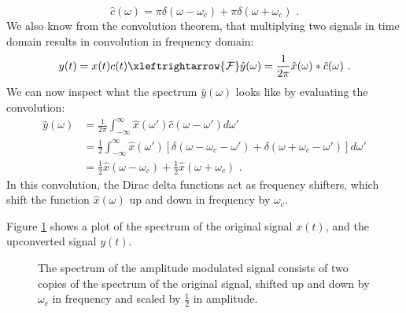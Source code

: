 \begin{equation}
\hat{c}(\omega) = \pi\delta(\omega - \omega_c) + \pi\delta(\omega + \omega_c)\,\,.
\end{equation}
We also know from the convolution theorem, that multiplying two
signals in time domain results in convolution in frequency domain:
\begin{equation}
y(t) = x(t) c(t) \xleftrightarrow{\mathcal{F}} \hat{y}(\omega) = \frac{1}{2\pi}\hat{x}(\omega) * \hat{c}(\omega)\,\,.
\end{equation}
We can now inspect what the spectrum $\hat{y}(\omega)$ looks like by
evaluating the convolution:
\begin{align}
\hat{y}(\omega) & = \frac{1}{2\pi}\int_{-\infty}^{\infty} \hat{x}(\omega') \hat{c}(\omega - \omega') d\omega' \\
  &= \frac{1}{2} \int_{-\infty}^{\infty} \hat{x}(\omega')\left[ \delta(\omega - \omega_c - \omega') + \delta(\omega + \omega_c - \omega') \right] d\omega' \\
   &= \frac{1}{2}\hat{x}(\omega-\omega_c) + \frac{1}{2}\hat{x}(\omega+\omega_c)\,\,.
\end{align}
In this convolution, the Dirac delta functions act as frequency
shifters, which shift the function $\hat{x}(\omega)$ up and down in
frequency by $\omega_c$.

Figure \ref{fig:am_spectra1} shows a plot of the spectrum of the original signal $x(t)$, and the
upconverted signal $y(t)$.
\begin{figure}
\begin{center}
\end{center}
\caption{The spectrum of the amplitude modulated signal consists of two
copies of the spectrum of the original signal, shifted up and down by
$\omega_c$ in frequency and scaled by $\frac{1}{2}$ in amplitude.}
\label{fig:am_spectra1}
\end{figure}



